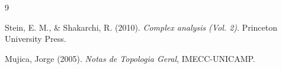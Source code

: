 \documentclass[a4paper, 17pt]{extarticle}
\begin{document}
{\small 
 
 
 
 
 


\begin{thebibliography}{9}


Stein, E. M., \& Shakarchi, R. (2010). \textit{Complex analysis (Vol. 2)}. Princeton University Press.

Mujica, Jorge (2005). \textit{Notas de Topologia Geral}, IMECC-UNICAMP.

\end{thebibliography}

}

\end{document}
